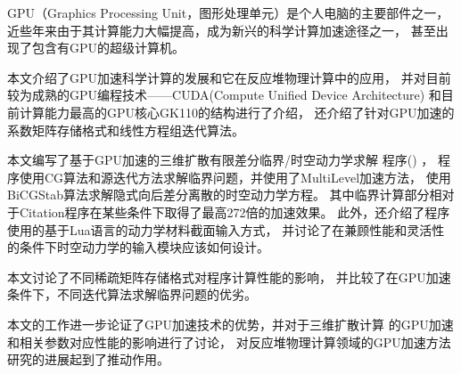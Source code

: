 






\begin{cabstract}
GPU（Graphics Processing Unit，图形处理单元）是个人电脑的主要部件之一，
近些年来由于其计算能力大幅提高，成为新兴的科学计算加速途径之一，
甚至出现了包含有GPU的超级计算机。

本文介绍了GPU加速科学计算的发展和它在反应堆物理计算中的应用，
并对目前较为成熟的GPU编程技术——CUDA(Compute Unified Device Architecture)
和目前计算能力最高的GPU核心GK110的结构进行了介绍，
还介绍了针对GPU加速的系数矩阵存储格式和线性方程组迭代算法。

本文编写了基于GPU加速的三维扩散有限差分临界/时空动力学求解
程序\ProgramName(\ProgramFullName) ，
程序使用CG算法和源迭代方法求解临界问题，并使用了MultiLevel加速方法，
使用BiCGStab算法求解隐式向后差分离散的时空动力学方程。
其中临界计算部分相对于Citation程序在某些条件下取得了最高272倍的加速效果。
此外，还介绍了\ProgramName 程序使用的基于Lua语言的动力学材料截面输入方式，
并讨论了在兼顾性能和灵活性的条件下时空动力学的输入模块应该如何设计。

本文讨论了不同稀疏矩阵存储格式对程序计算性能的影响，
并比较了在GPU加速条件下，不同迭代算法求解临界问题的优劣。

本文的工作进一步论证了GPU加速技术的优势，并对于三维扩散计算
的GPU加速和相关参数对应性能的影响进行了讨论，
对反应堆物理计算领域的GPU加速方法研究的进展起到了推动作用。

\end{cabstract}

